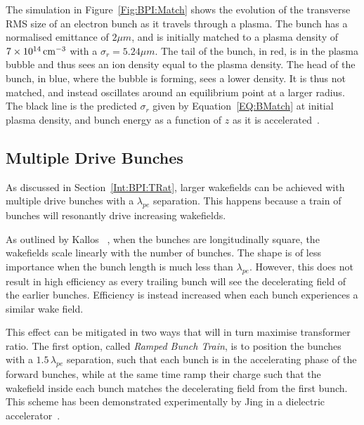 The simulation in Figure~\ref{Fig:BPI:Match} shows the evolution of the transverse RMS size of an electron bunch as it travels through a plasma.
The bunch has a normalised emittance of $2\unit{\mu m}$, and is initially matched to a plasma density of $7\times 10^{14}\,\mathrm{cm}^{-3}$ with a $\sigma_{r} = 5.24\unit{\mu m}$.
The tail of the bunch, in red, is in the plasma bubble and thus sees an ion density equal to the plasma density.
The head of the bunch, in blue, where the bubble is forming, sees a lower density.
It is thus not matched, and instead oscillates around an equilibrium point at a larger radius.
The black line is the predicted $\sigma_{r}$ given by Equation~\ref{EQ:BMatch} at initial plasma density, and bunch energy as a function of $z$ as it is accelerated~\cite{berglyd_olsen:2018}.

\subsection{Multiple Drive Bunches}
\label{Int:BPI:Multi}

As discussed in Section~\ref{Int:BPI:TRat}, larger wakefields can be achieved with multiple drive bunches with a $\lambda_{pe}$ separation.
This happens because a train of bunches will resonantly drive increasing wakefields.

As outlined by Kallos \etal~\cite{kallos:2007}, when the bunches are longitudinally square, the wakefields scale linearly with the number of bunches.
The shape is of less importance when the bunch length is much less than $\lambda_{pe}$.
However, this does not result in high efficiency as every trailing bunch will see the decelerating field of the earlier bunches.
Efficiency is instead increased when each bunch experiences a similar wake field.

This effect can be mitigated in two ways that will in turn maximise transformer ratio.
The first option, called \textit{Ramped Bunch Train}, is to position the bunches with a $1.5\,\lambda_{pe}$ separation, such that each bunch is in the accelerating phase of the forward bunches, while at the same time ramp their charge such that the wakefield inside each bunch matches the decelerating field from the first bunch.
This scheme has been demonstrated experimentally by Jing \etal in a dielectric accelerator~\cite{jing:2006,jing:2007}.

